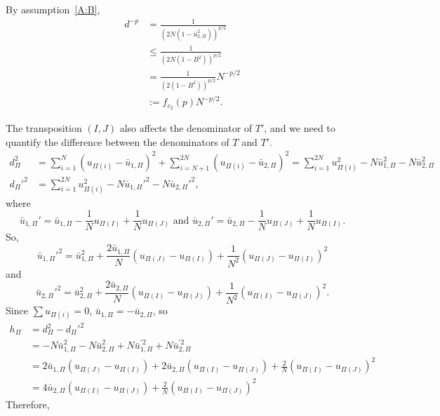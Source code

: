 By assumption~\eqref{A:B},
\begin{align}
  d^{-p} &= \frac{1}{(2N(1-\bar{u}_{2,\Pi}^2))^{p/2}} \nonumber \\
  &\leq \frac{1}{(2N(1-B^2))^{p/2}} \nonumber \\
  &= \frac{1}{(2(1-B^2))^{p/2}}N^{-p/2} \nonumber \\
  &:= f_{c_2}(p) N^{-p/2} \label{def:dp}.
\end{align}

The transposition $(I, J)$ also affects the denominator of $T'$, and we need to quantify the
difference between the denominators of $T$ and $T'$.  
\begin{align*}
    d_{\Pi}^2 &= \sum_{i=1}^N (u_{\Pi(i)} - \bar{u}_{1,\Pi})^2 + \sum_{i=N+1}^{2N} (u_{\Pi(i)} -
    \bar{u}_{2,\Pi})^2 = \sum_{i=1}^{2N} u_{\Pi(i)}^2 - N \bar{u}_{1,\Pi}^2 - N \bar{u}_{2,\Pi}^2 \\
    d_{\Pi}'^2 &= \sum_{i=1}^{2N} u_{\Pi(i)}^2 - N \bar{u}_{1,\Pi}'^2 - N \bar{u}_{2,\Pi}'^2,  
\end{align*}
where
\begin{equation*}
  \label{eq:6}
  \bar{u}_{1,\Pi}' = \bar{u}_{1,\Pi} - \frac{1}{N}u_{\Pi(I)} + \frac{1}{N}u_{\Pi(J)} \text{ and }
  \bar{u}_{2,\Pi}' = \bar{u}_{2,\Pi} - \frac{1}{N}u_{\Pi(J)} + \frac{1}{N}u_{\Pi(I)}.
\end{equation*}
So, 
\begin{equation*}
  \label{eq:7}
  \bar{u}_{1,\Pi}'^2 = \bar{u}_{1,\Pi}^2 + \frac{2\bar{u}_{1,\Pi}}{N}(u_{\Pi(J)}-u_{\Pi(I)}) +
  \frac{1}{N^2}(u_{\Pi(J)}-u_{\Pi(I)})^2
\end{equation*}
and
\begin{equation*}
  \label{eq:8}
  \bar{u}_{2,\Pi}'^2 = \bar{u}_{2,\Pi}^2 + \frac{2\bar{u}_{2,\Pi}}{N}(u_{\Pi(I)}-u_{\Pi(J)}) +
  \frac{1}{N^2}(u_{\Pi(I)}-u_{\Pi(J)})^2.
\end{equation*}
Since $\sum u_{\Pi(i)} = 0$, $\bar{u}_{1,\Pi} = -\bar{u}_{2,\Pi}$, so
\begin{align*}
  h_{\Pi} &= d_{\Pi}^2-d_{\Pi}'^2 \\
  &= -N \bar{u}_{1,\Pi}^2 -N \bar{u}_{2,\Pi}^2 + N\bar{u}_{1,\Pi}^{'2} + N\bar{u}_{2,\Pi}^{'2} \\
  &= 2\bar{u}_{1,\Pi}(u_{\Pi(J)}-u_{\Pi(I)}) + 2\bar{u}_{2,\Pi}(u_{\Pi(I)}-u_{\Pi(J)})+\frac{2}{N}(u_{\Pi(I)}-u_{\Pi(J)})^2 \\
  &= 4\bar{u}_{2,\Pi}(u_{\Pi(I)}-u_{\Pi(J)}) + \frac{2}{N}(u_{\Pi(I)}-u_{\Pi(J)})^2
\end{align*}
Therefore,
